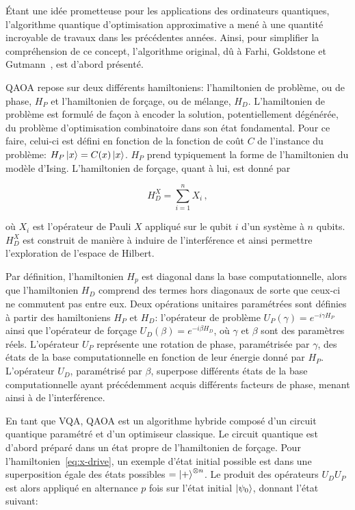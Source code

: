 Étant une idée prometteuse pour les applications des ordinateurs quantiques, l'algorithme quantique d'optimisation approximative a mené à une quantité incroyable de travaux dans les précédentes années. Ainsi, pour simplifier la compréhension de ce concept, l'algorithme original, dû à Farhi, Goldstone et Gutmann~\cite{farhiQuantumApproximateOptimization2014}, est d'abord présenté.

QAOA repose sur deux différents hamiltoniens: l'hamiltonien de problème, ou de phase, $H_{P}$ et l'hamiltonien de forçage, ou de mélange, $H_{D}$. L'hamiltonien de problème est formulé de façon à encoder la solution, potentiellement dégénérée, du problème d'optimisation combinatoire dans son état fondamental. Pour ce faire, celui-ci est défini en fonction de la fonction de coût $C$ de l'instance du problème: $H_{P}\ket{x} = C(x)\ket{x}$. $H_{P}$ prend typiquement la forme de l'hamiltonien du modèle d'Ising. L'hamiltonien de forçage, quant à lui, est donné par

\begin{equation}
    \label{eq:x-drive}
    H_{D}^{X} = \sum_{i=1}^{n} X_{i} \,,
\end{equation}

où $X_{i}$ est l'opérateur de Pauli $X$ appliqué sur le qubit $i$ d'un système à $n$ qubits. $H_{D}^{X}$ est construit de manière à induire de l'interférence et ainsi permettre l'exploration de l'espace de Hilbert. 

Par définition, l'hamiltonien $H_{p}$ est diagonal dans la base computationnelle, alors que l'hamiltonien $H_{D}$ comprend des termes hors diagonaux de sorte que ceux-ci ne commutent pas entre eux. Deux opérations unitaires paramétrées sont définies à partir des hamiltoniens $H_{P}$ et $H_{D}$: l'opérateur de problème $U_{P}(\gamma) = e^{-i \gamma H_{P}}$ ainsi que l'opérateur de forçage $U_{D}(\beta) = e^{-i \beta H_{D}}$, où $\gamma$ et $\beta$ sont des paramètres réels. L'opérateur $U_{P}$ représente une rotation de phase, paramétrisée par $\gamma$, des états de la base computationnelle en fonction de leur énergie donné par $H_{P}$. L'opérateur $U_{D}$, paramétrisé par $\beta$, superpose différents états de la base computationnelle ayant précédemment acquis différents facteurs de phase, menant ainsi à de l'interférence.

En tant que VQA, QAOA est un algorithme hybride composé d'un circuit quantique paramétré et d'un optimiseur classique. Le circuit quantique est d'abord préparé dans un état propre de l'hamiltonien de forçage. Pour l'hamiltonien~\ref{eq:x-drive}, un exemple d'état initial possible est dans une superposition égale des états possibles $= \ket{+}^{\otimes n}$. Le produit des opérateurs $U_{D}U_{P}$ est alors appliqué en alternance $p$ fois sur l'état initial $\ket{\psi_{0}}$, donnant l'état suivant:

